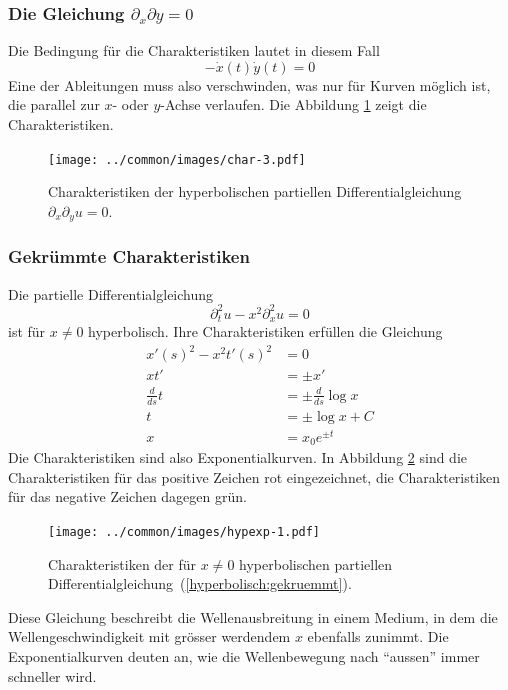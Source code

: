 \subsubsection{Die Gleichung $\partial_x\partial y=0$} Die Bedingung für die
Charakteristiken lautet in diesem Fall
\[
-\dot x(t)\dot y(t)=0
\]
Eine der Ableitungen muss also verschwinden, was nur für Kurven
möglich ist, die parallel zur $x$- oder $y$-Achse verlaufen.
Die Abbildung \ref{hyp:dxdy} zeigt die Charakteristiken.
\begin{figure}
\begin{center}
\texttt{[image: ../common/images/char-3.pdf]}
\end{center}
\caption{Charakteristiken der hyperbolischen
partiellen Differentialgleichung
$\partial_x\partial_yu=0$.
\label{hyp:dxdy}}
\end{figure}

\subsubsection{Gekrümmte Charakteristiken}
Die partielle Differentialgleichung
\begin{equation}
\partial_t^2u-x^2\partial_x^2u=0
\label{hyperbolisch:gekruemmt}
\end{equation}
ist für $x\ne 0$ hyperbolisch.
Ihre Charakteristiken erfüllen die Gleichung
\begin{align*}
x'(s)^2-x^2t'(s)^2&=0
\\
xt'&=\pm  x'
\\
\frac{d}{ds}t&=\pm\frac{d}{ds}\log x
\\
t&=\pm\log x+C
\\
x&=x_0e^{\pm t}
\end{align*}
Die Charakteristiken sind also Exponentialkurven. In Abbildung \ref{hyp:exp}
sind die Charakteristiken für das positive Zeichen rot eingezeichnet, die
Charakteristiken für das negative Zeichen dagegen grün.
\begin{figure}
\begin{center}
\texttt{[image: ../common/images/hypexp-1.pdf]}
\end{center}
\caption{Charakteristiken der für $x\ne 0$ hyperbolischen
partiellen Differentialgleichung~(\ref{hyperbolisch:gekruemmt}).
\label{hyp:exp}}
\end{figure}

Diese Gleichung beschreibt die Wellenausbreitung in einem Medium,
in dem die Wellengeschwindigkeit mit grösser werdendem $x$ ebenfalls
zunimmt. Die Exponentialkurven deuten an, wie die Wellenbewegung nach ``aussen''
immer schneller wird.

